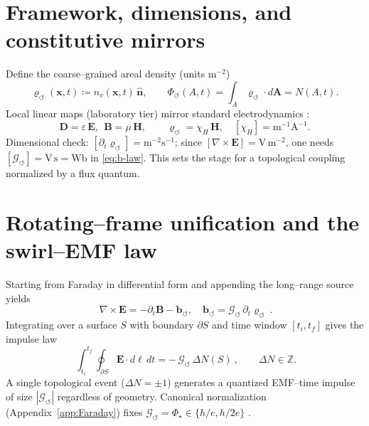\documentclass[12pt]{article}
\newcommand{\bmvarrho}{\bm{\varrho}_{\!\boldsymbol{\circlearrowleft}}}
\newcommand{\Gsw}{\mathcal{G}_{\!\boldsymbol{\circlearrowleft}}}
\newcommand{\eqdef}{\coloneqq}
\begin{document}
\section{Framework, dimensions, and constitutive mirrors}
    Define the coarse--grained areal density (units $\mathrm{m^{-2}}$)
    \begin{equation}
    \bmvarrho(\mathbf x,t)\eqdef n_v(\mathbf x,t)\,\hat{\mathbf n},\qquad
    \Phi_{\!\boldsymbol{\circlearrowleft}}(A,t)=\int_A \bmvarrho\!\cdot d\mathbf A = N(A,t).
    \label{eq:rho-def}
    \end{equation}
    Local linear maps (laboratory tier) mirror standard electrodynamics \cite{LandauLifshitzEDCM}:
    \begin{equation}
    \mathbf D=\varepsilon\,\mathbf E,\ \ \mathbf B=\mu\,\mathbf H,
    \qquad
    \bmvarrho=\chi_H\,\mathbf H,\quad [\chi_H]=\mathrm{m^{-1}A^{-1}}.
    \label{eq:const-rel}
    \end{equation}
    Dimensional check: $[\partial_t\bmvarrho]=\mathrm{m^{-2}s^{-1}}$; since $[\nabla\times\mathbf E]=\mathrm{V\,m^{-2}}$, one needs $[\Gsw]=\mathrm{V\,s}=\mathrm{Wb}$ in \eqref{eq:b-law}. This sets the stage for a topological coupling normalized by a flux quantum.

\section{Rotating--frame unification and the swirl--EMF law}
    Starting from Faraday in differential form and appending the long–range source yields
    \begin{equation}
    \boxed{\ \nabla\times\mathbf E=-\partial_t\mathbf B-\mathbf b_{\!\boldsymbol{\circlearrowleft}},\quad
    \mathbf b_{\!\boldsymbol{\circlearrowleft}}=\Gsw\,\partial_t\bmvarrho\ }.
    \label{eq:Faraday-mod}
    \end{equation}
    Integrating over a surface $S$ with boundary $\partial S$ and time window $[t_i,t_f]$ gives the impulse law
    \begin{equation}
    \boxed{\ \int_{t_i}^{t_f}\!\!\oint_{\partial S}\mathbf E\!\cdot d\boldsymbol\ell\,dt
        =-\,\Gsw\,\Delta N(S)\ },\qquad \Delta N\in\mathbb Z.
    \label{eq:impulse}
    \end{equation}
    A single topological event ($\Delta N=\pm1$) generates a quantized EMF--time impulse of size $|\Gsw|$ regardless of geometry. Canonical normalization (Appendix~\ref{app:Faraday}) fixes $\Gsw=\Phi_\star\in\{h/e,h/2e\}$ \cite{Deaver1961,Doll1961}.
\end{document}
